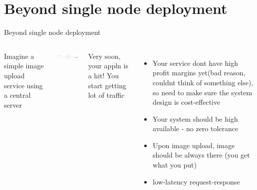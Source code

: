 \documentclass[9pt]{beamer}
\begin{document}
\section{Beyond single node deployment}
\begin{frame}{Beyond single node deployment}
  \begin{columns}
    Imagine a simple image upload service using a central server
    \begin{itemize}
      \includegraphics[width=50mm, scale=0.4]{img/data_access.png}
    \end{itemize}
    Very soon, your appln is a hit! You start getting lot of traffic

    \begin{itemize}
      \pause
      \item Your service dont have high profit margins yet(bad reason, couldnt think of something else), so need to make sure the system design is cost-effective
        \pause
        \item Your system should be high available - no zero tolerance
          \pause
        \item Upon image upload, image should be always there (you get what you put)
          \pause
        \item low-latency request-response
    \end{itemize}
  \end{columns}
\end{frame}

\end{document}
